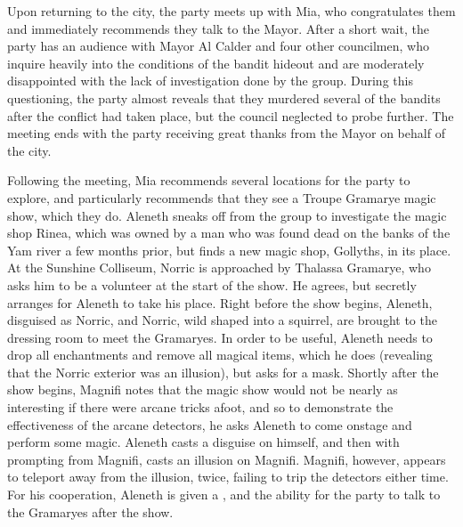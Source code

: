 Upon returning to the city, the party meets up with Mia, who congratulates them and immediately recommends they talk to the Mayor. After a short wait, the party has an audience with Mayor Al Calder and four other councilmen, who inquire heavily into the conditions of the bandit hideout and are moderately disappointed with the lack of investigation done by the group. During this questioning, the party almost reveals that they murdered several of the bandits after the conflict had taken place, but the council neglected to probe further. The meeting ends with the party receiving great thanks from the Mayor on behalf of the city.

Following the meeting, Mia recommends several locations for the party to explore, and particularly recommends that they see a Troupe Gramarye magic show, which they do. Aleneth sneaks off from the group to investigate the magic shop Rinea, which was owned by a man who was found dead on the banks of the Yam river a few months prior, but finds a new magic shop, Gollyths, in its place. At the Sunshine Colliseum, Norric is approached by Thalassa Gramarye, who asks him to be a volunteer at the start of the show. He agrees, but secretly arranges for Aleneth to take his place. Right before the show begins, Aleneth, disguised as Norric, and Norric, wild shaped into a squirrel, are brought to the dressing room to meet the Gramaryes. In order to be useful, Aleneth needs to drop all enchantments and remove all magical items, which he does (revealing that the Norric exterior was an illusion), but asks for a mask. Shortly after the show begins, Magnifi notes that the magic show would not be nearly as interesting if there were arcane tricks afoot, and so to demonstrate the effectiveness of the arcane detectors, he asks Aleneth to come onstage and perform some magic. Aleneth casts a disguise on himself, and then with prompting from Magnifi, casts an illusion on Magnifi. Magnifi, however, appears to teleport away from the illusion, twice, failing to trip the detectors either time. For his cooperation, Aleneth is given a , and the ability for the party to talk to the Gramaryes after the show.